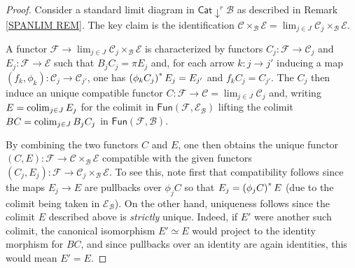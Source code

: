 \documentclass[a4paper,10pt
,draft
]{article}%
\renewcommand{\1}{\eta}%
\begin{document}
\begin{proof}
Consider a standard limit diagram in
$\mathsf{Cat} \downarrow^r \mathcal{B} $
as described in Remark \ref{SPANLIM REM}.
The key claim is the identification
$
\mathcal{C} \times_{\mathcal{B}} \mathcal{E}
=
\lim_{j \in J}
\mathcal{C}_j \times_{\mathcal{B}} \mathcal{E}
$.

A functor $\mathcal{F} \to \lim_{j \in J}
\mathcal{C}_j \times_{\mathcal{B}} \mathcal{E}$
is characterized by functors
$C_j\colon \mathcal{F} \to \mathcal{C}_j$
and 
$E_j\colon \mathcal{F} \to \mathcal{E}$
such that
$B_j C_j = \pi E_j$
and, for each arrow $k \colon j \to j'$
inducing a map 
$(f_k,\phi_k) \colon \mathcal{C}_j \to \mathcal{C}_{j'}$,
one has
$\left(\phi_k C_j\right)^{\**} E_j = E_{j'}$
and
$f_k C_j = C_{j'}$.
The $C_j$ then induce an unique compatible functor
$C \colon \mathcal{F} \to \mathcal{C} = 
\lim_{j \in J}
\mathcal{C}_j$ and,
writing 
$E = \operatorname{colim}_{j \in J} E_j$ for the colimit in 
$\mathsf{Fun}(\mathcal{F},\mathcal{E}_{\mathcal{B}})$
lifting
the colimit
$BC = \operatorname{colim}_{j \in J} B_jC_j$
in 
$\mathsf{Fun}(\mathcal{F},\mathcal{B})$.

By combining the two functors $C$ and $E$, one then obtains the unique functor  
$(C,E) \colon \mathcal{F} \to 
\mathcal{C} \times_{\mathcal{B}} \mathcal{E}$
compatible with the given functors
$(C_j,E_j) \colon \mathcal{F} \to 
\mathcal{C}_j \times_{\mathcal{B}} \mathcal{E}$.
To see this, note first that compatibility follows since the maps 
$E_j \to E$ are pullbacks over $\phi_j C$ so that
$E_j = \left( \phi_j C \right)^{\**} E$
(due to the colimit being taken in $\mathcal{E}_{\mathcal{B}}$). 
On the other hand, uniqueness follows since the colimit $E$ described above is \textit{strictly} unique. Indeed, if $E'$ were another such colimit, the canonical isomorphism $E'\simeq E$ would project to the identity 
morphism for $BC$, and since pullbacks over an identity are again identities, this would mean $E'=E$.
\end{proof}
\end{document}
